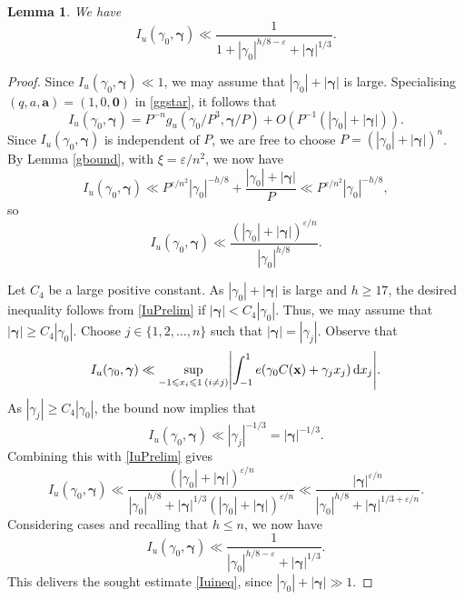 \documentclass[12pt,reqno]{amsart}
\newtheorem{lemma}[thm]{Lemma}
\theoremstyle{definition}
\theoremstyle{remark}
\numberwithin{equation}{section}
\begin{document}
\begin{lemma} We have
\begin{equation} \label{Iuineq}
I_u({{\gamma}}_0, {\boldsymbol{{\gamma}}}) \ll
\frac1{1+|{{\gamma}}_0|^{h/8-{\varepsilon}} + |{\boldsymbol{{\gamma}}}|^{1/3}}.
\end{equation}
\end{lemma}

\begin{proof}
Since $I_u({{\gamma}}_0,{\boldsymbol{{\gamma}}}) \ll 1$, we may assume that $|{{\gamma}}_0| + |{\boldsymbol{{\gamma}}}|$ is large. Specialising $(q,a,{\mathbf a}) = (1,0,{\mathbf 0})$ in \eqref{ggstar}, it follows that
\[
I_u({{\gamma}}_0,{\boldsymbol{{\gamma}}}) = P^{-n}g_u({{\gamma}}_0/P^3, {\boldsymbol{{\gamma}}}/P) + O(P^{-1} (|{{\gamma}}_0| + |{\boldsymbol{{\gamma}}}|)).
\]
Since $I_u({{\gamma}}_0,{\boldsymbol{{\gamma}}})$ is independent of $P$, we are free to choose $P = (|{{\gamma}}_0| + |{\boldsymbol{{\gamma}}}|)^n$. By Lemma \ref{gbound}, with $\xi = {\varepsilon}/n^2$, we now have
\[
I_u({{\gamma}}_0,{\boldsymbol{{\gamma}}}) \ll P^{{\varepsilon}/n^2} |{{\gamma}}_0|^{-h/8} + \frac{ |{{\gamma}}_0| + |{\boldsymbol{{\gamma}}}|}P
\ll P^{{\varepsilon}/n^2} |{{\gamma}}_0|^{-h/8},
\]
so
\begin{equation} \label{IuPrelim}
I_u({{\gamma}}_0,{\boldsymbol{{\gamma}}}) \ll \frac{(|{{\gamma}}_0| + |{\boldsymbol{{\gamma}}}|)^{{\varepsilon}/n}}{|{{\gamma}}_0|^{h/8}}.
\end{equation}

Let $C_4$ be a large positive constant. As $|{{\gamma}}_0| + |{\boldsymbol{{\gamma}}}|$ is large and $h {\geqslant} 17$, the desired inequality follows from \eqref{IuPrelim} if $|{\boldsymbol{{\gamma}}}| < C_4 |{{\gamma}}_0|$. Thus, we may assume that $|{\boldsymbol{{\gamma}}}| {\geqslant} C_4 |{{\gamma}}_0|$. Choose $j \in \{1,2,\ldots,n \}$ such that $|{\boldsymbol{{\gamma}}}| = |{{\gamma}}_j|$. Observe that
\[
I_u({{\gamma}}_0,{\boldsymbol{{\gamma}}}) \ll \sup_{-1 {\leqslant} x_i {\leqslant} 1 \: (i \ne j)} \Biggl| \int_{-1}^1 e({{\gamma}}_0 C({\mathbf x}) + {{\gamma}}_j x_j) {{\,{\rm d}}} x_j \Biggr|.
\]
As $|{{\gamma}}_j| {\geqslant} C_4 |{{\gamma}}_0|$, the bound \cite[Theorem 7.3]{Vau1997} now implies that
\[
I_u({{\gamma}}_0,{\boldsymbol{{\gamma}}}) \ll |{{\gamma}}_j|^{-1/3} = |{\boldsymbol{{\gamma}}}|^{-1/3}.
\]
Combining this with \eqref{IuPrelim} gives
\[
I_u({{\gamma}}_0,{\boldsymbol{{\gamma}}}) \ll 
\frac{(|{{\gamma}}_0| + |{\boldsymbol{{\gamma}}}|)^{{\varepsilon}/n}}{|{{\gamma}}_0|^{h/8} + |{\boldsymbol{{\gamma}}}|^{1/3}(|{{\gamma}}_0| + |{\boldsymbol{{\gamma}}}|)^{{\varepsilon}/n}}
\ll \frac{|{\boldsymbol{{\gamma}}}|^{{\varepsilon}/n}}{|{{\gamma}}_0|^{h/8} + |{\boldsymbol{{\gamma}}}|^{1/3+{\varepsilon}/n}}.
\]
Considering cases and recalling that $h {\leqslant} n$, we now have
\[
I_u({{\gamma}}_0,{\boldsymbol{{\gamma}}}) \ll 
\frac1{|{{\gamma}}_0|^{h/8-{\varepsilon}} + |{\boldsymbol{{\gamma}}}|^{1/3}}.
\]
This delivers the sought estimate \eqref{Iuineq}, since $|{{\gamma}}_0| + |{\boldsymbol{{\gamma}}}| \gg 1$.
\end{proof}
\end{document}
